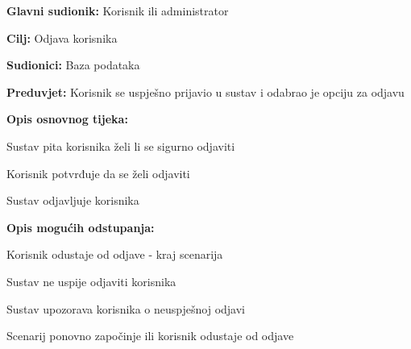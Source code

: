 					\noindent {}
					\begin{packed_item}
	
						\item \textbf{Glavni sudionik: }Korisnik ili administrator
						\item  \textbf{Cilj:} Odjava korisnika
						\item  \textbf{Sudionici:} Baza podataka
						\item  \textbf{Preduvjet:} Korisnik se uspješno prijavio u sustav i odabrao je opciju za odjavu
						\item  \textbf{Opis osnovnog tijeka:}
						
						\item[] \begin{packed_enum}
							\item Sustav pita korisnika želi li se sigurno odjaviti
							\item Korisnik potvrđuje da se želi odjaviti
							\item Sustav odjavljuje korisnika
						\end{packed_enum}
						\item  \textbf{Opis mogućih odstupanja:}

						\item[] \begin{packed_item}
							\item[2.a] Korisnik odustaje od odjave - kraj scenarija
							\item[3.a] Sustav ne uspije odjaviti korisnika
							\item[] \begin{packed_enum}
								\item Sustav upozorava korisnika o neuspješnoj odjavi 
								\item Scenarij ponovno započinje ili korisnik odustaje od odjave
							\end{packed_enum}						
						\end{packed_item}
					\end{packed_item}

